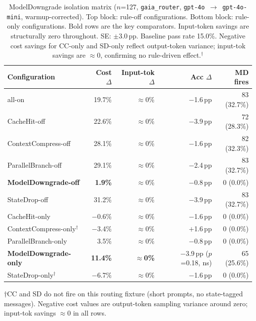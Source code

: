 \documentclass[sigconf,9pt]{acmart}
\begin{document}
\begin{table}[t]
\caption{ModelDowngrade isolation matrix ($n$=127, \texttt{gaia\_router},
\texttt{gpt-4o}~$\rightarrow$~\texttt{gpt-4o-mini}, warmup-corrected). Top block:
rule-off configurations. Bottom block: rule-only configurations. Bold rows are the
key comparators. Input-token savings are structurally zero throughout. SE:
$\pm$3.0\,pp. Baseline pass rate 15.0\%. Negative cost savings for CC-only
and SD-only reflect output-token variance; input-tok savings are $\approx$0,
confirming no rule-driven effect.$^\dagger$}
\label{tab:md-matrix}
\small
\begin{tabular}{lrrrr}
\toprule
Configuration & Cost $\Delta$ & Input-tok $\Delta$ & Acc $\Delta$ & MD fires \\
\midrule
all-on                          & 19.7\% & $\approx$0\% & $-$1.6\,pp & 83 (32.7\%) \\
CacheHit-off                    & 22.6\% & $\approx$0\% & $-$3.9\,pp & 72 (28.3\%) \\
ContextCompress-off             & 28.1\% & $\approx$0\% & $-$1.6\,pp & 82 (32.3\%) \\
ParallelBranch-off              & 29.1\% & $\approx$0\% & $-$2.4\,pp & 83 (32.7\%) \\
\textbf{ModelDowngrade-off}     & \textbf{1.9\%} & $\approx$0\% & $-$0.8\,pp & 0 (0.0\%) \\
StateDrop-off                   & 31.2\% & $\approx$0\% & $-$3.9\,pp & 83 (32.7\%) \\
\midrule
CacheHit-only                   & $-$0.6\% & $\approx$0\% & $-$1.6\,pp & 0 (0.0\%) \\
ContextCompress-only$^\dagger$  & $-$3.4\% & $\approx$0\% & $+$1.6\,pp & 0 (0.0\%) \\
ParallelBranch-only             & 3.5\%  & $\approx$0\% & $-$0.8\,pp & 0 (0.0\%) \\
\textbf{ModelDowngrade-only}    & \textbf{11.4\%} & \textbf{$\approx$0\%} & $-$3.9\,pp ($p$=0.18, ns) & 65 (25.6\%) \\
StateDrop-only$^\dagger$        & $-$6.7\% & $\approx$0\% & $-$1.6\,pp & 0 (0.0\%) \\
\bottomrule
\end{tabular}
\footnotesize{$\dagger$CC and SD do not fire on this routing fixture (short prompts, no state-tagged messages). Negative cost values are output-token sampling variance around zero; input-tok savings $\approx$0 in all rows.}
\end{table}
\end{document}
